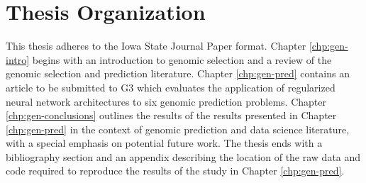 \section{Thesis Organization}

This thesis adheres to the Iowa State Journal Paper format. 
Chapter \ref{chp:gen-intro} begins with an introduction to genomic selection and a review of the
genomic selection and prediction literature. Chapter \ref{chp:gen-pred} contains an article to be 
submitted to G3 which evaluates the application of regularized neural network architectures to six genomic
prediction problems. Chapter \ref{chp:gen-conclusions} outlines the results of the results presented
in Chapter \ref{chp:gen-pred} in the context of genomic prediction and data science literature, with a special
emphasis on potential future work. The thesis ends with a bibliography section and an appendix describing
the location of the raw data and code required to reproduce the results of the study in Chapter \ref{chp:gen-pred}.


